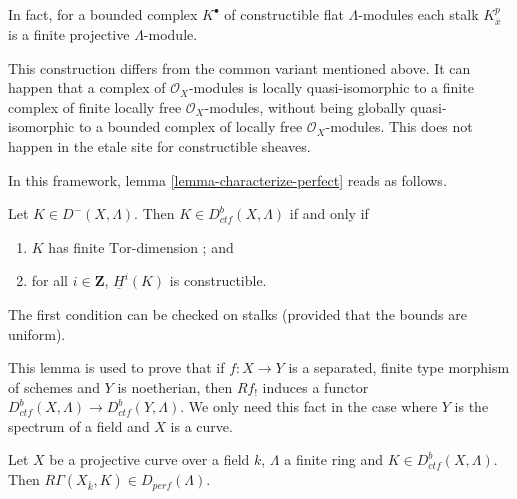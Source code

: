 \begin{remark}
\label{remark-projective-each-degree}
In fact, for a bounded complex $K^\bullet$ of constructible flat
$\Lambda$-modules each stalk $K^p_{\overline{x}}$ is a finite projective
$\Lambda$-module.
\end{remark}

\begin{remark}
\label{remark-different}
This construction differs from the common variant mentioned above. It can
happen that a complex of $\mathcal{O}_X$-modules is locally quasi-isomorphic to
a finite complex of finite locally free $\mathcal{O}_X$-modules, without being
globally quasi-isomorphic to a bounded complex of locally free
$\mathcal{O}_X$-modules. This does not happen in the etale site for
constructible sheaves.
\end{remark}

\noindent
In this framework, lemma \ref{lemma-characterize-perfect} reads as
follows.

\begin{lemma}
\label{lemma-when-ctf}
Let $K\in D^-(X, \Lambda)$. Then $K\in D_{ctf}^b(X, \Lambda)$ if and only if
\begin{enumerate}
\item
$K$ has finite $\text{Tor}$-dimension ; and
\item
for all $i \in \mathbf{Z}$, $\underline{H}^i(K)$ is constructible.
\end{enumerate}
\end{lemma}

\noindent
The first condition can be checked on stalks (provided that the bounds are
uniform).

\begin{remark}
\label{remark-how-used}
This lemma is used to prove that if $f: X \to Y$ is a separated, finite type
morphism of schemes and $Y$ is noetherian, then $Rf_!$ induces a functor
$D_{ctf}^b(X, \Lambda) \to D_{ctf}^b (Y, \Lambda)$. We only need this fact in
the case where $Y$ is the spectrum of a field and $X$ is a curve.
\end{remark}

\begin{proposition}
\label{proposition-projective-curve-constructible-cohomology}
Let $X$ be a projective curve over a field $k$, $\Lambda$ a finite ring and
$K\in D_{ctf}^b (X, \Lambda)$. Then $R\Gamma(X_{\bar k}, K)\in
D_{perf}(\Lambda)$.
\end{proposition}

